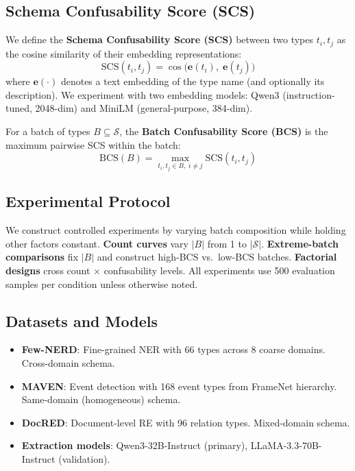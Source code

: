 \documentclass[11pt,a4paper]{article}
\begin{document}
\subsection{Schema Confusability Score (SCS)}

We define the \textbf{Schema Confusability Score (SCS)} between two types $t_i, t_j$ as the cosine similarity of their embedding representations:
\begin{equation}
\text{SCS}(t_i, t_j) = \cos\bigl(\mathbf{e}(t_i),\; \mathbf{e}(t_j)\bigr)
\end{equation}
where $\mathbf{e}(\cdot)$ denotes a text embedding of the type name (and optionally its description).
We experiment with two embedding models: Qwen3 (instruction-tuned, 2048-dim) and MiniLM (general-purpose, 384-dim).

For a batch of types $B \subseteq \mathcal{S}$, the \textbf{Batch Confusability Score (BCS)} is the maximum pairwise SCS within the batch:
\begin{equation}
\text{BCS}(B) = \max_{t_i, t_j \in B,\; i \neq j} \text{SCS}(t_i, t_j)
\end{equation}

\subsection{Experimental Protocol}

We construct controlled experiments by varying batch composition while holding other factors constant.
\textbf{Count curves} vary $|B|$ from 1 to $|\mathcal{S}|$.
\textbf{Extreme-batch comparisons} fix $|B|$ and construct high-BCS vs.\ low-BCS batches.
\textbf{Factorial designs} cross count $\times$ confusability levels.
All experiments use 500 evaluation samples per condition unless otherwise noted.

\subsection{Datasets and Models}

\begin{itemize}
\item \textbf{Few-NERD}: Fine-grained NER with 66 types across 8 coarse domains. Cross-domain schema.
\item \textbf{MAVEN}: Event detection with 168 event types from FrameNet hierarchy. Same-domain (homogeneous) schema.
\item \textbf{DocRED}: Document-level RE with 96 relation types. Mixed-domain schema.
\item \textbf{Extraction models}: Qwen3-32B-Instruct (primary), LLaMA-3.3-70B-Instruct (validation).
\end{itemize}
\end{document}
